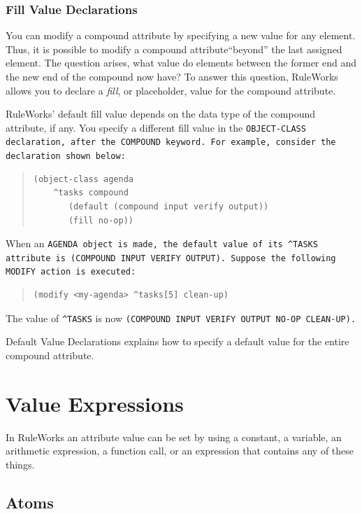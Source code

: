 \subsubsection{Fill Value Declarations}

You can modify a compound attribute by specifying a new value for any
element. Thus, it is possible to modify a compound attribute``beyond''
the last assigned element. The question arises, what value do elements
between the former end and the new end of the compound now have? To
answer this question, RuleWorks allows you to declare a \emph{fill},
or placeholder, value for the compound attribute.

RuleWorks' default fill value depends on the data type of the compound
attribute, if any. You specify a different fill value in the
\tt{OBJECT-CLASS} declaration, after the \tt{COMPOUND} keyword. For
example, consider the declaration shown below:

\begin{quote}
\begin{verbatim}
(object-class agenda
    ^tasks compound
       (default (compound input verify output))
       (fill no-op))
\end{verbatim}
\end{quote}

When an \tt{AGENDA} object is made, the default value of its
\verb|^TASKS| attribute is \tt{(COMPOUND INPUT VERIFY
  OUTPUT)}. Suppose the following \tt{MODIFY} action is executed:

\begin{quote}
\begin{verbatim}
(modify <my-agenda> ^tasks[5] clean-up)
\end{verbatim}
\end{quote}

The value of \verb|^TASKS| is now \tt{(COMPOUND INPUT VERIFY OUTPUT
  NO-OP CLEAN-UP)}.

Default Value Declarations explains how to specify a default value for
the entire compound attribute.

\section{Value Expressions}

In RuleWorks an attribute value can be set by using a constant, a
variable, an arithmetic expression, a function call, or an expression
that contains any of these things.

\subsection{Atoms}

